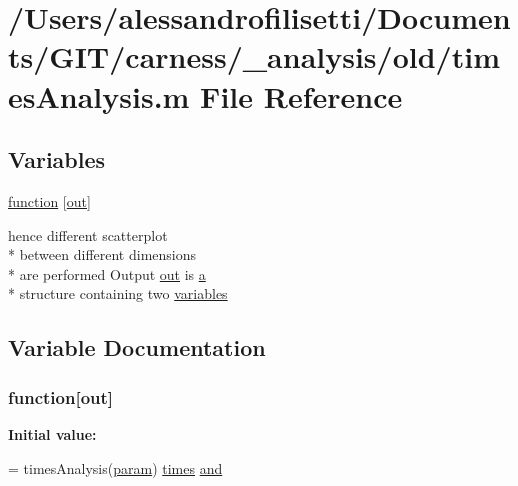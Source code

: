 \hypertarget{a00037}{\section{/\+Users/alessandrofilisetti/\+Documents/\+G\+I\+T/carness/\+\_\+analysis/old/times\+Analysis.m File Reference}
\label{a00037}
}
\subsection*{Variables}
\begin{DoxyCompactItemize}
\item 
\hyperlink{a00037_a370f3dd25136a73d619eba0aa2e3bb4b}{function} \mbox{[}\hyperlink{a00028_a34c820385e9209f49c18739329ad9206}{out}\mbox{]}
\item 
hence different scatterplot \\*
between different dimensions \\*
are performed Output \hyperlink{a00028_a34c820385e9209f49c18739329ad9206}{out} is \hyperlink{a00035_a2ffdbad9ea59541e59cbd2b938e0770c}{a} \\*
structure containing two \hyperlink{a00037_a075795b83d470ba58980e465541f16e9}{variables}
\end{DoxyCompactItemize}


\subsection{Variable Documentation}
\hypertarget{a00037_a370f3dd25136a73d619eba0aa2e3bb4b}{
\subsubsection[{function}]{\setlength{\rightskip}{0pt plus 5cm}function\mbox{[}{\bf out}\mbox{]}}}\label{a00037_a370f3dd25136a73d619eba0aa2e3bb4b}
{\bfseries Initial value\+:}
\begin{DoxyCode}
= timesAnalysis(\hyperlink{a00028_a51f20d6b1b54a2eee3be0e8adc96a0ae}{param})
%
      \hyperlink{a00028_a47868b053902b822eab5c738a67a633a}{times} \hyperlink{a00028_a170f8acb213f91bf71c77b1d20bceb33}{and}
\end{DoxyCode}



